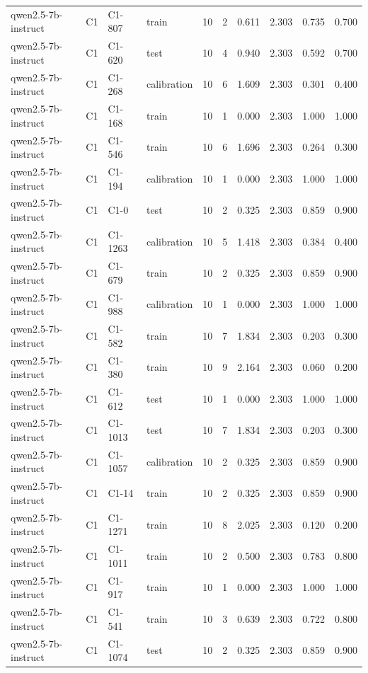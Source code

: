 \begin{table}
\begin{tabular}{llllrrrrrr}
qwen2.5-7b-instruct & C1 & C1-807 & train & 10 & 2 & 0.611 & 2.303 & 0.735 & 0.700 \\
qwen2.5-7b-instruct & C1 & C1-620 & test & 10 & 4 & 0.940 & 2.303 & 0.592 & 0.700 \\
qwen2.5-7b-instruct & C1 & C1-268 & calibration & 10 & 6 & 1.609 & 2.303 & 0.301 & 0.400 \\
qwen2.5-7b-instruct & C1 & C1-168 & train & 10 & 1 & 0.000 & 2.303 & 1.000 & 1.000 \\
qwen2.5-7b-instruct & C1 & C1-546 & train & 10 & 6 & 1.696 & 2.303 & 0.264 & 0.300 \\
qwen2.5-7b-instruct & C1 & C1-194 & calibration & 10 & 1 & 0.000 & 2.303 & 1.000 & 1.000 \\
qwen2.5-7b-instruct & C1 & C1-0 & test & 10 & 2 & 0.325 & 2.303 & 0.859 & 0.900 \\
qwen2.5-7b-instruct & C1 & C1-1263 & calibration & 10 & 5 & 1.418 & 2.303 & 0.384 & 0.400 \\
qwen2.5-7b-instruct & C1 & C1-679 & train & 10 & 2 & 0.325 & 2.303 & 0.859 & 0.900 \\
qwen2.5-7b-instruct & C1 & C1-988 & calibration & 10 & 1 & 0.000 & 2.303 & 1.000 & 1.000 \\
qwen2.5-7b-instruct & C1 & C1-582 & train & 10 & 7 & 1.834 & 2.303 & 0.203 & 0.300 \\
qwen2.5-7b-instruct & C1 & C1-380 & train & 10 & 9 & 2.164 & 2.303 & 0.060 & 0.200 \\
qwen2.5-7b-instruct & C1 & C1-612 & test & 10 & 1 & 0.000 & 2.303 & 1.000 & 1.000 \\
qwen2.5-7b-instruct & C1 & C1-1013 & test & 10 & 7 & 1.834 & 2.303 & 0.203 & 0.300 \\
qwen2.5-7b-instruct & C1 & C1-1057 & calibration & 10 & 2 & 0.325 & 2.303 & 0.859 & 0.900 \\
qwen2.5-7b-instruct & C1 & C1-14 & train & 10 & 2 & 0.325 & 2.303 & 0.859 & 0.900 \\
qwen2.5-7b-instruct & C1 & C1-1271 & train & 10 & 8 & 2.025 & 2.303 & 0.120 & 0.200 \\
qwen2.5-7b-instruct & C1 & C1-1011 & train & 10 & 2 & 0.500 & 2.303 & 0.783 & 0.800 \\
qwen2.5-7b-instruct & C1 & C1-917 & train & 10 & 1 & 0.000 & 2.303 & 1.000 & 1.000 \\
qwen2.5-7b-instruct & C1 & C1-541 & train & 10 & 3 & 0.639 & 2.303 & 0.722 & 0.800 \\
qwen2.5-7b-instruct & C1 & C1-1074 & test & 10 & 2 & 0.325 & 2.303 & 0.859 & 0.900 \\

\end{tabular}
\end{table}
